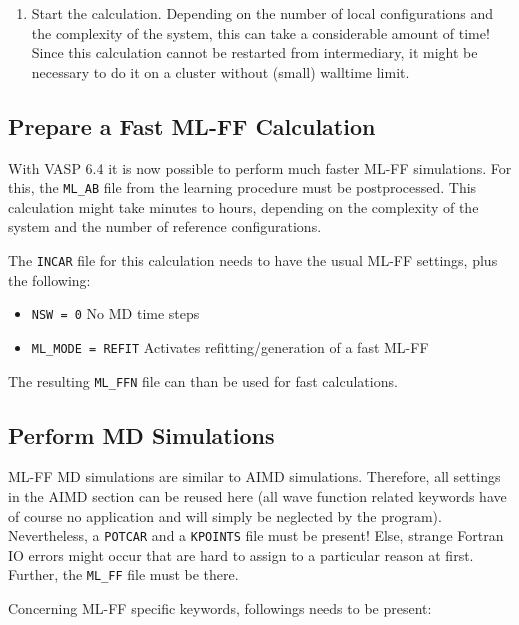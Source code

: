 \documentclass[a4paper,11pt]{article}
\begin{document}
\begin{enumerate}
   
   \item Start the calculation. Depending on the number of local configurations and the complexity of the system, this can 
   take a considerable amount of time! Since this calculation cannot be restarted from intermediary, it might be necessary
   to do it on a cluster without (small) walltime limit.
\end{enumerate}

\subsection{Prepare a Fast ML-FF Calculation}

With VASP 6.4 it is now possible to perform much faster ML-FF simulations. For this, the \texttt{ML\_AB} file 
from the learning procedure must be postprocessed. This calculation might take minutes to hours, depending
on the complexity of the system and the number of reference configurations.

The \texttt{INCAR} file for this calculation needs to have the usual ML-FF settings, plus the following:

\begin{itemize}
 \item \texttt{NSW = 0} No MD time steps
 \item \texttt{ML\_MODE = REFIT} Activates refitting/generation of a fast ML-FF 
\end{itemize}

The resulting \texttt{ML\_FFN} file can than be used for fast calculations.

\subsection{Perform MD Simulations}

ML-FF MD simulations are similar to AIMD simulations. Therefore, all settings in the AIMD section can be reused here (all wave function
related keywords have of course no application and will simply be neglected by the program). Nevertheless, 
a \texttt{POTCAR} and a \texttt{KPOINTS} file must be present! Else, strange Fortran IO errors might occur that are hard 
to assign to a particular reason at first.
Further, the \texttt{ML\_FF} file must be there.

Concerning ML-FF specific keywords, followings needs to be present:
\end{document}
